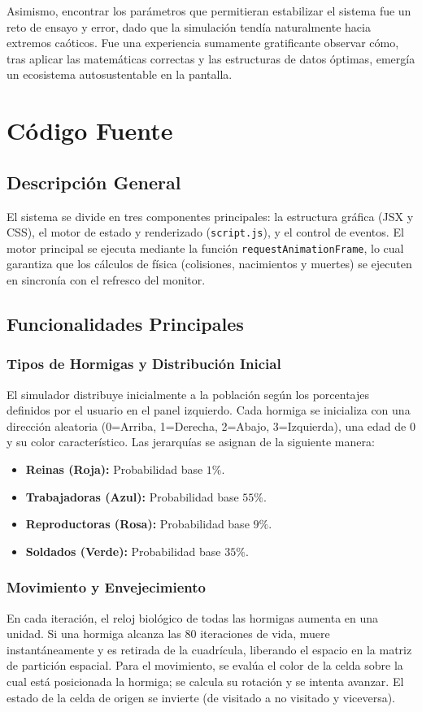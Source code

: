 \documentclass[12pt,a4paper]{article}
\begin{document}
Asimismo, encontrar los parámetros que permitieran estabilizar el sistema fue un reto de ensayo y error, dado que la simulación tendía naturalmente hacia extremos caóticos. Fue una experiencia sumamente gratificante observar cómo, tras aplicar las matemáticas correctas y las estructuras de datos óptimas, emergía un ecosistema autosustentable en la pantalla.

\section{Código Fuente}

\subsection{Descripción General}
El sistema se divide en tres componentes principales: la estructura gráfica (JSX y CSS), el motor de estado y renderizado (\texttt{script.js}), y el control de eventos. El motor principal se ejecuta mediante la función \texttt{requestAnimationFrame}, lo cual garantiza que los cálculos de física (colisiones, nacimientos y muertes) se ejecuten en sincronía con el refresco del monitor.

\subsection{Funcionalidades Principales}

\subsubsection{Tipos de Hormigas y Distribución Inicial}
El simulador distribuye inicialmente a la población según los porcentajes definidos por el usuario en el panel izquierdo. Cada hormiga se inicializa con una dirección aleatoria (0=Arriba, 1=Derecha, 2=Abajo, 3=Izquierda), una edad de 0 y su color característico. Las jerarquías se asignan de la siguiente manera:
\begin{itemize}
    \item \textbf{Reinas (Roja):} Probabilidad base $1\%$.
    \item \textbf{Trabajadoras (Azul):} Probabilidad base $55\%$.
    \item \textbf{Reproductoras (Rosa):} Probabilidad base $9\%$.
    \item \textbf{Soldados (Verde):} Probabilidad base $35\%$.
\end{itemize}

\subsubsection{Movimiento y Envejecimiento}
En cada iteración, el reloj biológico de todas las hormigas aumenta en una unidad. Si una hormiga alcanza las 80 iteraciones de vida, muere instantáneamente y es retirada de la cuadrícula, liberando el espacio en la matriz de partición espacial. Para el movimiento, se evalúa el color de la celda sobre la cual está posicionada la hormiga; se calcula su rotación y se intenta avanzar. El estado de la celda de origen se invierte (de visitado a no visitado y viceversa).
\end{document}
